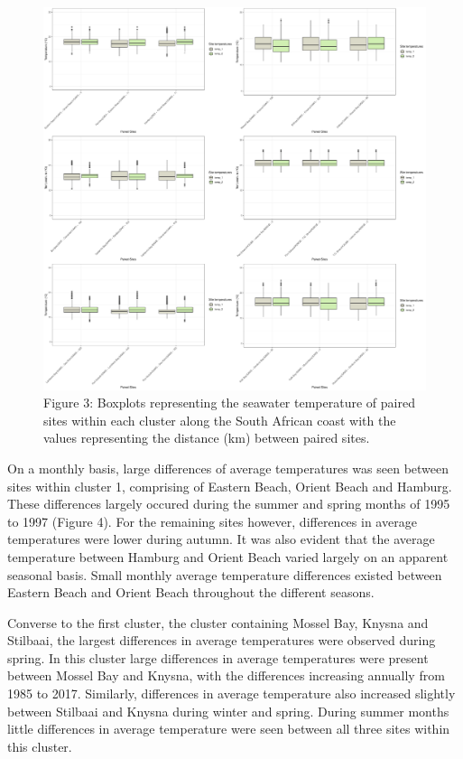 \documentclass[12pt,A4paper,]{article}
\begin{document}
\begin{figure}
\centering
\includegraphics{../figures/combined_plot.pdf}
\caption{Figure 3: Boxplots representing the seawater temperature of
paired sites within each cluster along the South African coast with the
values representing the distance (km) between paired sites.}
\end{figure}

On a monthly basis, large differences of average temperatures was seen
between sites within cluster 1, comprising of Eastern Beach, Orient
Beach and Hamburg. These differences largely occured during the summer
and spring months of 1995 to 1997 (Figure 4). For the remaining sites
however, differences in average temperatures were lower during autumn.
It was also evident that the average temperature between Hamburg and
Orient Beach varied largely on an apparent seasonal basis. Small monthly
average temperature differences existed between Eastern Beach and Orient
Beach throughout the different seasons.

Converse to the first cluster, the cluster containing Mossel Bay, Knysna
and Stilbaai, the largest differences in average temperatures were
observed during spring. In this cluster large differences in average
temperatures were present between Mossel Bay and Knysna, with the
differences increasing annually from 1985 to 2017. Similarly,
differences in average temperature also increased slightly between
Stilbaai and Knysna during winter and spring. During summer months
little differences in average temperature were seen between all three
sites within this cluster.
\end{document}
